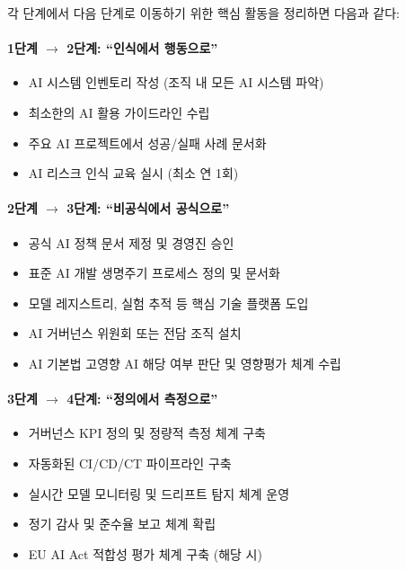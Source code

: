각 단계에서 다음 단계로 이동하기 위한 핵심 활동을 정리하면 다음과 같다:

\paragraph{1단계 $\rightarrow$ 2단계: ``인식에서 행동으로''}
\begin{itemize}
    \item AI 시스템 인벤토리 작성 (조직 내 모든 AI 시스템 파악)
    \item 최소한의 AI 활용 가이드라인 수립
    \item 주요 AI 프로젝트에서 성공/실패 사례 문서화
    \item AI 리스크 인식 교육 실시 (최소 연 1회)
\end{itemize}

\paragraph{2단계 $\rightarrow$ 3단계: ``비공식에서 공식으로''}
\begin{itemize}
    \item 공식 AI 정책 문서 제정 및 경영진 승인
    \item 표준 AI 개발 생명주기 프로세스 정의 및 문서화
    \item 모델 레지스트리, 실험 추적 등 핵심 기술 플랫폼 도입
    \item AI 거버넌스 위원회 또는 전담 조직 설치
    \item AI 기본법 고영향 AI 해당 여부 판단 및 영향평가 체계 수립
\end{itemize}

\paragraph{3단계 $\rightarrow$ 4단계: ``정의에서 측정으로''}
\begin{itemize}
    \item 거버넌스 KPI 정의 및 정량적 측정 체계 구축
    \item 자동화된 CI/CD/CT 파이프라인 구축
    \item 실시간 모델 모니터링 및 드리프트 탐지 체계 운영
    \item 정기 감사 및 준수율 보고 체계 확립
    \item EU AI Act 적합성 평가 체계 구축 (해당 시)
\end{itemize}

